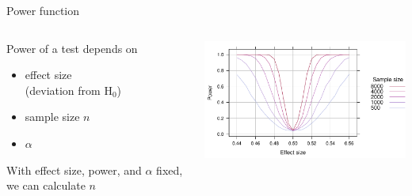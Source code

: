 \documentclass[aspectratio=169]{beamer}
\begin{document}
\begin{frame}{Power function}

\begin{columns}
\begin{column}{4.5cm}
Power of a test depends on\\[1ex]

\begin{itemize}
\item effect size\\
(deviation from H$_0$)

\item sample size $n$

\item $\alpha$\\[2ex]
\end{itemize}

With effect size, power, and $\alpha$ fixed, we can calculate $n$
\end{column}
%
\begin{column}{10cm}
\includegraphics[width=10cm]{fig/OCbinomtest}
\end{column}
\end{columns}

\end{frame}

% 
% 
%
%
%
\end{document}
